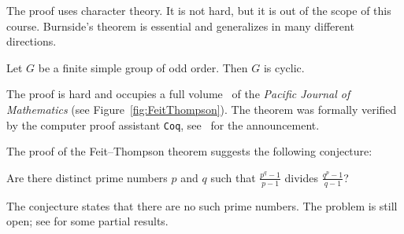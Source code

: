 The proof uses character theory. 
It is not hard, but it is out of the scope of this course. 
Burnside's theorem
is essential and generalizes in many different directions. 

\begin{theorem}
Let $G$ be a finite simple group of odd order. Then $G$ is cyclic. 
\end{theorem}

The proof is hard and occupies a full volume~\cite{MR166261} of 
the \emph{Pacific Journal of Mathematics} (see Figure~\ref{fig:FeitThompson}).   
The theorem was formally verified 
by the computer proof assistant \lstinline{Coq}, 
see~\cite{MR3111271} for the announcement. 

The proof of the Feit--Thompson theorem suggests the following conjecture:

\begin{problem}
Are there distinct prime numbers $p$ and $q$ such that
$\frac {p^{q}-1}{p-1}$ divides $\frac{q^{p} - 1}{q - 1}$? 
\end{problem}

The conjecture states that there are no such prime numbers. 
The problem is still open; see \cite{MR297686} for some partial results. 

